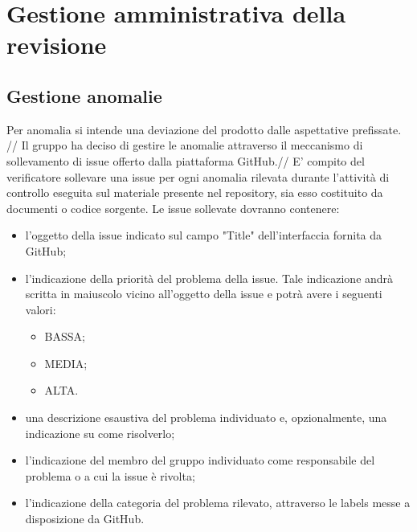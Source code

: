 \section{Gestione amministrativa della revisione}
	\subsection{Gestione anomalie}
		Per anomalia si intende una deviazione del prodotto dalle aspettative prefissate. //
		Il gruppo ha deciso di gestire le anomalie attraverso il meccanismo di sollevamento di issue offerto dalla piattaforma GitHub.//
		E' compito del verificatore sollevare una issue per ogni anomalia rilevata durante l'attività di controllo eseguita sul materiale presente nel repository, sia esso costituito da documenti o codice sorgente.
		Le issue sollevate dovranno contenere:
		\begin{itemize}
			\item l'oggetto della issue indicato sul campo "Title" dell'interfaccia fornita da GitHub;
			\item l'indicazione della priorità del problema della issue. Tale indicazione andrà scritta in maiuscolo vicino all'oggetto della issue e potrà avere i seguenti valori:
				\begin{itemize}
					\item BASSA;
					\item MEDIA;
					\item ALTA.
				\end{itemize}
			\item una descrizione esaustiva del problema individuato e, opzionalmente, una indicazione su come risolverlo;
			\item l'indicazione del membro del gruppo \groupname{} individuato come responsabile del problema o a cui la issue è rivolta;
			\item l'indicazione della categoria del problema rilevato, attraverso le labels messe a disposizione da GitHub.
		\end{itemize}